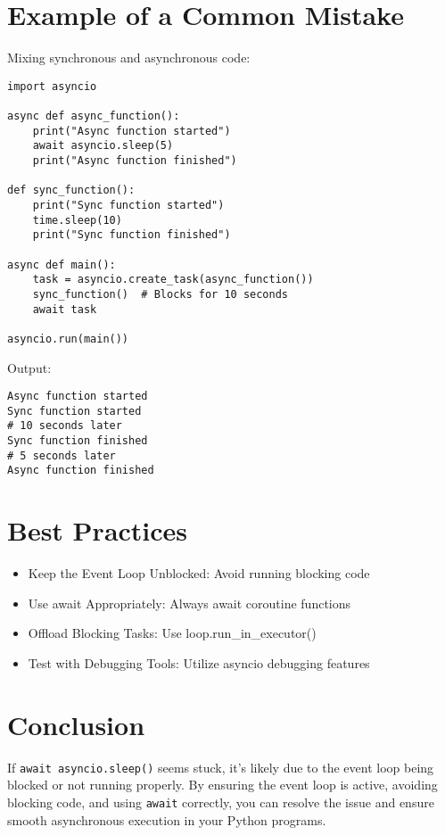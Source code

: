 \begin{tcolorbox}[
colback=pinkcolor!10!white,
colframe=pinkcolor!100!red,
left=2mm,
right=2mm,
title=\small\centering\textcolor{black}{Complete Guide to await asyncio.sleep() Issues},
breakable=true
]
\section*{Example of a Common Mistake}
Mixing synchronous and asynchronous code:
\begin{verbatim}
import asyncio

async def async_function():
    print("Async function started")
    await asyncio.sleep(5)
    print("Async function finished")

def sync_function():
    print("Sync function started")
    time.sleep(10)
    print("Sync function finished")

async def main():
    task = asyncio.create_task(async_function())
    sync_function()  # Blocks for 10 seconds
    await task

asyncio.run(main())
\end{verbatim}

Output:
\begin{verbatim}
Async function started
Sync function started
# 10 seconds later
Sync function finished
# 5 seconds later
Async function finished
\end{verbatim}

\section*{Best Practices}
\begin{itemize}
\item Keep the Event Loop Unblocked: Avoid running blocking code
\item Use await Appropriately: Always await coroutine functions
\item Offload Blocking Tasks: Use loop.run\_in\_executor()
\item Test with Debugging Tools: Utilize asyncio debugging features
\end{itemize}

\section*{Conclusion}
If \texttt{await asyncio.sleep()} seems stuck, it's likely due to the event loop being blocked or not running properly. By ensuring the event loop is active, avoiding blocking code, and using \texttt{await} correctly, you can resolve the issue and ensure smooth asynchronous execution in your Python programs.


\end{tcolorbox}

